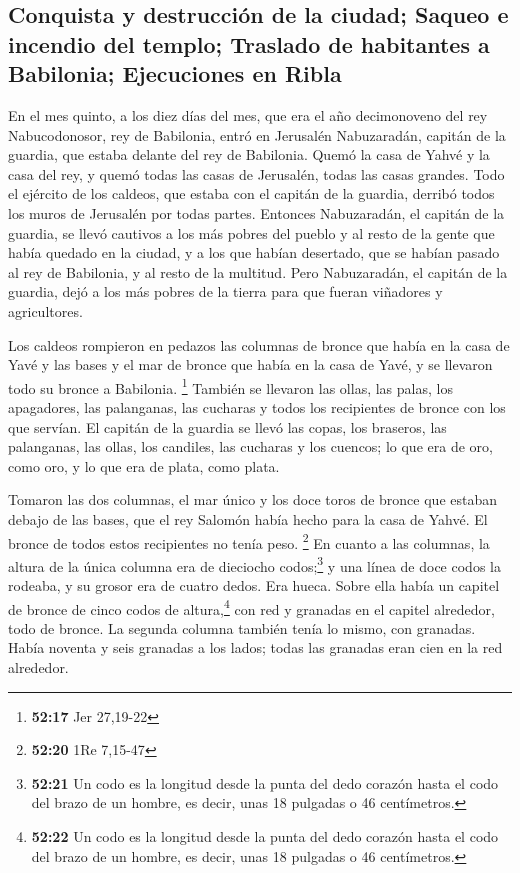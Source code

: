 \begin{paracol}{2}
\hypertarget{conquista-y-destrucciuxf3n-de-la-ciudad-saqueo-e-incendio-del-templo-traslado-de-habitantes-a-babilonia-ejecuciones-en-ribla}{%
\subsection{Conquista y destrucción de la ciudad; Saqueo e incendio del
templo; Traslado de habitantes a Babilonia; Ejecuciones en
Ribla}\label{conquista-y-destrucciuxf3n-de-la-ciudad-saqueo-e-incendio-del-templo-traslado-de-habitantes-a-babilonia-ejecuciones-en-ribla}}

 En el mes quinto, a los diez días del mes, que era el
año decimonoveno del rey Nabucodonosor, rey de Babilonia, entró en
Jerusalén Nabuzaradán, capitán de la guardia, que estaba delante del rey
de Babilonia.  Quemó la casa de Yahvé y la casa del rey,
y quemó todas las casas de Jerusalén, todas las casas grandes.
 Todo el ejército de los caldeos, que estaba con el
capitán de la guardia, derribó todos los muros de Jerusalén por todas
partes.  Entonces Nabuzaradán, el capitán de la guardia,
se llevó cautivos a los más pobres del pueblo y al resto de la gente que
había quedado en la ciudad, y a los que habían desertado, que se habían
pasado al rey de Babilonia, y al resto de la multitud. 
Pero Nabuzaradán, el capitán de la guardia, dejó a los más pobres de la
tierra para que fueran viñadores y agricultores.

 Los caldeos rompieron en pedazos las columnas de bronce
que había en la casa de Yavé y las bases y el mar de bronce que había en
la casa de Yavé, y se llevaron todo su bronce a Babilonia. \footnote{\textbf{52:17}
  Jer 27,19-22}  También se llevaron las ollas, las
palas, los apagadores, las palanganas, las cucharas y todos los
recipientes de bronce con los que servían.  El capitán de
la guardia se llevó las copas, los braseros, las palanganas, las ollas,
los candiles, las cucharas y los cuencos; lo que era de oro, como oro, y
lo que era de plata, como plata.

 Tomaron las dos columnas, el mar único y los doce toros
de bronce que estaban debajo de las bases, que el rey Salomón había
hecho para la casa de Yahvé. El bronce de todos estos recipientes no
tenía peso. \footnote{\textbf{52:20} 1Re 7,15-47}  En
cuanto a las columnas, la altura de la única columna era de dieciocho
codos;\footnote{\textbf{52:21} Un codo es la longitud desde la punta del
  dedo corazón hasta el codo del brazo de un hombre, es decir, unas 18
  pulgadas o 46 centímetros.} y una línea de doce codos la rodeaba, y su
grosor era de cuatro dedos. Era hueca.  Sobre ella había
un capitel de bronce de cinco codos de altura,\footnote{\textbf{52:22}
  Un codo es la longitud desde la punta del dedo corazón hasta el codo
  del brazo de un hombre, es decir, unas 18 pulgadas o 46 centímetros.}
con red y granadas en el capitel alrededor, todo de bronce. La segunda
columna también tenía lo mismo, con granadas.  Había
noventa y seis granadas a los lados; todas las granadas eran cien en la
red alrededor.


\end{paracol}
